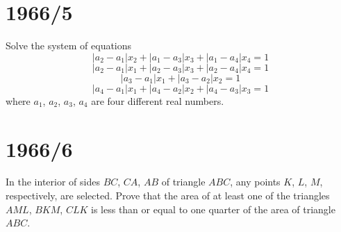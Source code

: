 \documentclass[12pt]{article}
\begin{document}
\section*{1966/5}
Solve the system of equations
$$
|a_{2}-a_{1}|x_{2}+|a_{1}-a_{3}|x_{3}+|a_{1}-a_{4}|x_{4}=1
$$
$$
|a_{2}-a_{1}|x_{1}+|a_{2}-a_{3}|x_{3}+|a_{2}-a_{4}|x_{4}=1
$$
$$
|a_{3}-a_{1}|x_{1}+|a_{3}-a_{2}|x_{2}=1
$$
$$
|a_{4}-a_{1}|x_{1}+|a_{4}-a_{2}|x_{2}+|a_{4}-a_{3}|x_{3}=1
$$
where $a_1$, $a_2$, $a_3$, $a_4$ are four different real numbers.
\section*{1966/6}
In the interior of sides $BC$, $CA$, $AB$ of triangle $ABC$, any points $K$, $L$, $M$, respectively, are selected. Prove that the area of at least one of the triangles $AML$, $BKM$, $CLK$ is less than or equal to one quarter of the area of triangle $ABC$.
\end{document}
